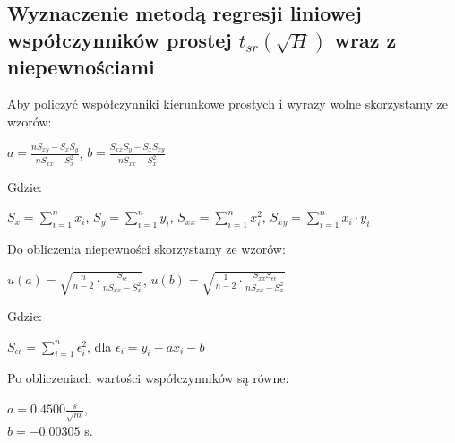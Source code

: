 \documentclass[12pt]{article}
\begin{document}


\subsection*{Wyznaczenie metodą regresji liniowej współczynników prostej
    $t_{sr}(\sqrt{H})$ wraz z niepewnościami}

Aby policzyć współczynniki kierunkowe prostych i wyrazy wolne skorzystamy ze
wzorów:
\begin{flushleft}

    \begin{center}
        $a = \frac{nS_{xy} - S_xS_y}{nS_{xx}-S_x^2}$, $b
            =\frac{S_{xx}S_y-S_xS_{xy}}{nS_{xx}-S_x^2}$
    \end{center}
    Gdzie: \\
    \begin{center}
        $S_x=\displaystyle\sum_{i=1}^{n}x_i$,
        $S_y=\displaystyle\sum_{i=1}^{n}y_i$,
        $S_{xx}=\displaystyle\sum_{i=1}^{n}x_i^2$,
        $S_{xy}=\displaystyle\sum_{i=1}^{n}x_i \cdot y_i$ \\
    \end{center}
\end{flushleft}

\begin{flushleft}
    Do obliczenia niepewności skorzystamy ze wzorów:
    \begin{center}
        $u(a) = \sqrt{\frac{n}{n-2} \cdot
                \frac{S_{\epsilon\epsilon}}{nS_{xx}-S_x^2}}$, $u(b) =
            \sqrt{\frac{1}{n-2} \cdot
            \frac{S_{xx}S_{\epsilon\epsilon}}{nS_{xx}-S_x^2}}$ \\
    \end{center}
    Gdzie: \\
    \begin{center}
        $S_{\epsilon\epsilon}=\displaystyle\sum_{i=1}^{n}\epsilon_i^2$, dla
        $\epsilon_i = y_i - ax_i - b$
    \end{center}

\end{flushleft}

\begin{flushleft}
    Po obliczeniach wartości współczynników są równe:
\end{flushleft}

\begin{center}
    $a = 0.4500\frac{s}{\sqrt{m}}$, \\
    $b = -0.00305$ s.
\end{center}
\end{document}
